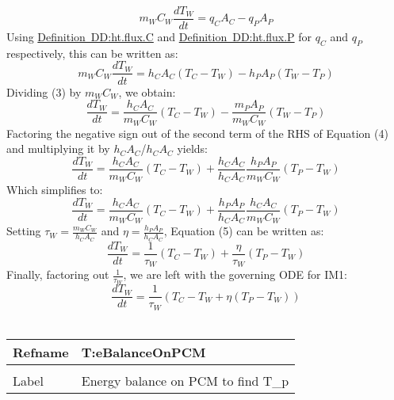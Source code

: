 \documentclass[12pt]{article}
\begin{document}
\begin{equation}
m_{W}C_{W}\frac{dT_{W}}{dt}=q_{C}A_{C}-q_{P}A_{P}
\end{equation}
Using \hyperref[DD:ht.flux.C]{Definition~DD:ht.flux.C} and \hyperref[DD:ht.flux.P]{Definition~DD:ht.flux.P} for $q_{C}$ and $q_{P}$ respectively, this can be written as:
\begin{equation}
m_{W}C_{W}\frac{dT_{W}}{dt}=h_{C}A_{C}\left(T_{C}-T_{W}\right)-h_{P}A_{P}\left(T_{W}-T_{P}\right)
\end{equation}
Dividing (3) by $m_{W}$$C_{W}$, we obtain:
\begin{equation}
\frac{dT_{W}}{dt}=\frac{h_{C}A_{C}}{m_{W}C_{W}}\left(T_{C}-T_{W}\right)-\frac{m_{P}A_{P}}{m_{W}C_{W}}\left(T_{W}-T_{P}\right)
\end{equation}
Factoring the negative sign out of the second term of the RHS of Equation (4) and multiplying it by $h_{C}$$A_{C}$/$h_{C}$$A_{C}$ yields:
\begin{equation}
\frac{dT_{W}}{dt}=\frac{h_{C}A_{C}}{m_{W}C_{W}}\left(T_{C}-T_{W}\right)+\frac{h_{C}A_{C}}{h_{C}A_{C}}\frac{h_{P}A_{P}}{m_{W}C_{W}}\left(T_{P}-T_{W}\right)
\end{equation}
Which simplifies to:
\begin{equation}
\frac{dT_{W}}{dt}=\frac{h_{C}A_{C}}{m_{W}C_{W}}\left(T_{C}-T_{W}\right)+\frac{h_{P}A_{P}}{h_{C}A_{C}}\frac{h_{C}A_{C}}{m_{W}C_{W}}\left(T_{P}-T_{W}\right)
\end{equation}
Setting $\tau{}_{W}=\frac{m_{W}C_{W}}{h_{C}A_{C}}$ and $\eta{}=\frac{h_{P}A_{P}}{h_{C}A_{C}}$, Equation (5) can be written as:
\begin{equation}
\frac{dT_{W}}{dt}=\frac{1}{\tau{}_{W}}\left(T_{C}-T_{W}\right)+\frac{\eta{}}{\tau{}_{W}}\left(T_{P}-T_{W}\right)
\end{equation}
Finally, factoring out $\frac{1}{\tau{}_{W}}$, we are left with the governing ODE for IM1:
\begin{equation}
\frac{dT_{W}}{dt}=\frac{1}{\tau{}_{W}}\left(T_{C}-T_{W}+\eta{}\left(T_{P}-T_{W}\right)\right)
\end{equation}
~\newline
\noindent \begin{minipage}{\textwidth}
\begin{tabular}{p{} p{}}
\toprule \textbf{Refname} & \textbf{T:eBalanceOnPCM}
\label{T:eBalanceOnPCM}
\\ \midrule \\
Label & Energy balance on PCM to find T_p

\end{tabular}
\end{minipage}$$
\end{document}
